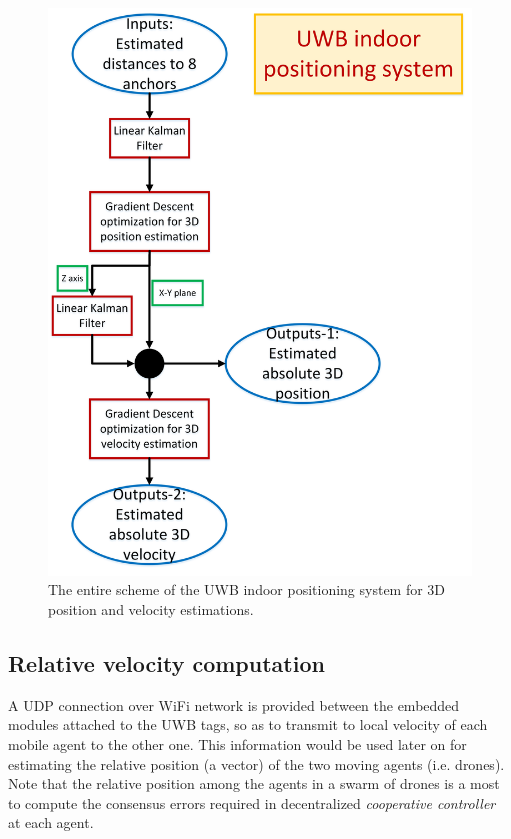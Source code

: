 \documentclass{article}
\begin{document}
\begin{figure}[thpb]
\centering
\includegraphics[scale=0.4]{Pics/UWB_position_velocity_estimations.jpg}
\caption{The entire scheme of the UWB indoor positioning system for 3D position and velocity estimations.}
\label{Fig_scheme_total}
\end{figure}



\newpage
\subsection{Relative velocity computation}
A UDP connection over WiFi network is provided between the embedded modules attached to the UWB tags, so as to transmit to local velocity of each mobile agent to the other one. 
This information would be used later on for estimating the relative position (a vector) of the two moving agents (i.e. drones).
Note that the relative position among the agents in a swarm of drones is a most to compute the consensus errors required in decentralized \textit{cooperative controller} at each agent.
\end{document}
